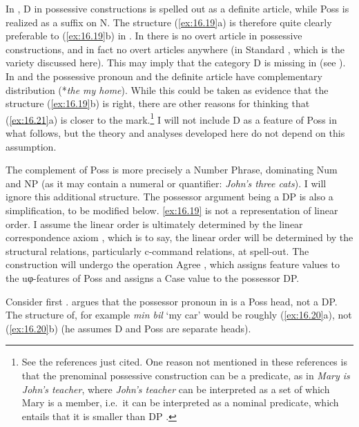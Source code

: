 \documentclass[output=paper]{langsci/langscibook}
\begin{document}
In , D in possessive constructions is spelled out as a definite
article, while Poss is realized as a suffix on N. The structure (\ref{ex:16.19}a) is
therefore quite clearly preferable to (\ref{ex:16.19}b) in .  In  there is
no overt article in possessive constructions, and in fact no overt articles
anywhere (in Standard , which is the variety discussed here). This may
imply that the category D is missing in  (see \citealt{Boskovic:2009}).
In  and  the possessive pronoun and the definite article have
complementary distribution (*\emph{the my home}). While this could be taken as
evidence that the structure (\ref{ex:16.19}b) is right, there are other
reasons for thinking that (\ref{ex:16.21}a) is closer to the
mark.\footnote{See the references just cited. One reason not mentioned in
    these references is that the pre\-nominal possessive construction can be a
    predicate, as in \emph{Mary is John’s teacher}, where \emph{John’s teacher}
    can be interpreted as a set of which Mary is a member, i.e.\ it can be
    interpreted as a nominal predicate, which entails that it is smaller than
    DP \citep{Holmberg1993}.} I will not include D as a feature of Poss in what
    follows, but the theory and analyses developed here do not depend on this
    assumption.

The complement of Poss is more precisely a Number Phrase, dominating Num and NP
(as it may contain a numeral or quantifier: \emph{John’s three cats}). I will
ignore this additional structure. The possessor argument being a DP is also a
simplification, to be modified below. \eqref{ex:16.19} is not a representation of linear
order. I assume the linear order is ultimately determined by the linear
correspondence axiom  \citep{Kayne1994}, which is to say, the linear order will
be determined by the structural relations, particularly c-command relations, at
spell-out. The construction will undergo the operation Agree
\citep{Chomsky2001}, which assigns feature values to the uφ-features of
Poss and assigns a Case value to the possessor DP.

Consider first . \textcite{Delsing1993,Delsing1998} argues that
the possessor pronoun in  is a Poss head, not a DP. The structure
of, for example \emph{min bil} `my car' would be roughly (\ref{ex:16.20}a),
not (\ref{ex:16.20}b) (he assumes D and Poss are separate heads).
\end{document}
